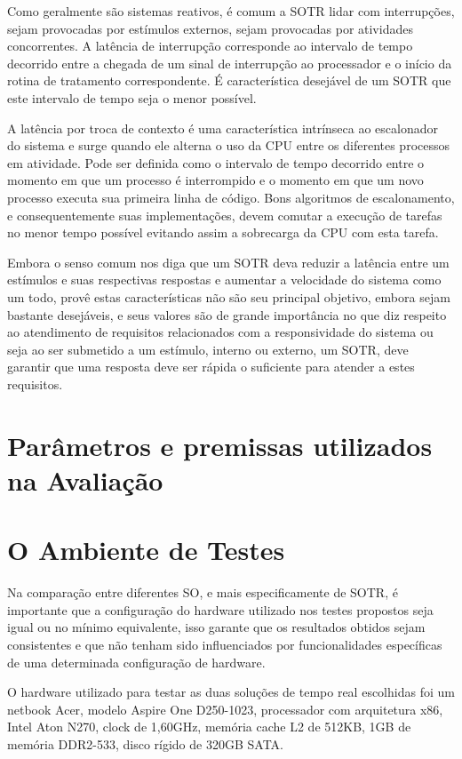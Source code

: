 Como geralmente são sistemas reativos, é comum a SOTR lidar com interrupções, sejam provocadas por estímulos externos, sejam provocadas por atividades concorrentes. A latência de interrupção corresponde ao intervalo de tempo decorrido entre a chegada de um sinal de interrupção ao processador e o início da rotina de tratamento correspondente. É característica desejável de um SOTR que este intervalo de tempo seja o menor possível.

A latência por troca de contexto é uma característica intrínseca ao escalonador do sistema e surge quando ele alterna o uso da CPU entre os diferentes processos em atividade. Pode ser definida como o intervalo de tempo decorrido entre o momento em que um processo é interrompido e o momento em que um novo processo executa sua primeira linha de código. Bons algoritmos de escalonamento, e consequentemente suas implementações, devem comutar a execução de tarefas no menor tempo possível evitando assim a sobrecarga da CPU com esta tarefa.

Embora o senso comum nos diga que um SOTR deva reduzir a latência entre um estímulos e suas respectivas respostas e aumentar a velocidade do sistema como um todo, provê estas características não são seu principal objetivo, embora sejam bastante desejáveis, e seus valores são de grande importância no que diz respeito ao atendimento de requisitos relacionados com a responsividade do sistema ou seja ao ser submetido a um estímulo, interno ou externo, um SOTR, deve garantir que uma resposta deve ser rápida o suficiente para atender a estes requisitos.

\section{Parâmetros e premissas utilizados na Avaliação}

\section{O Ambiente de Testes}
Na comparação entre diferentes SO, e mais especificamente de SOTR,  é importante que a configuração do hardware utilizado nos testes propostos seja igual ou no mínimo equivalente, isso garante que os resultados obtidos sejam consistentes e que não tenham sido influenciados por funcionalidades específicas de uma determinada configuração de hardware.

O hardware utilizado para testar as duas soluções de tempo real escolhidas foi um netbook Acer, modelo Aspire One D250-1023, processador com arquitetura x86, Intel Aton N270, clock de 1,60GHz, memória cache L2 de 512KB, 1GB de memória DDR2-533, disco rígido de 320GB SATA.

